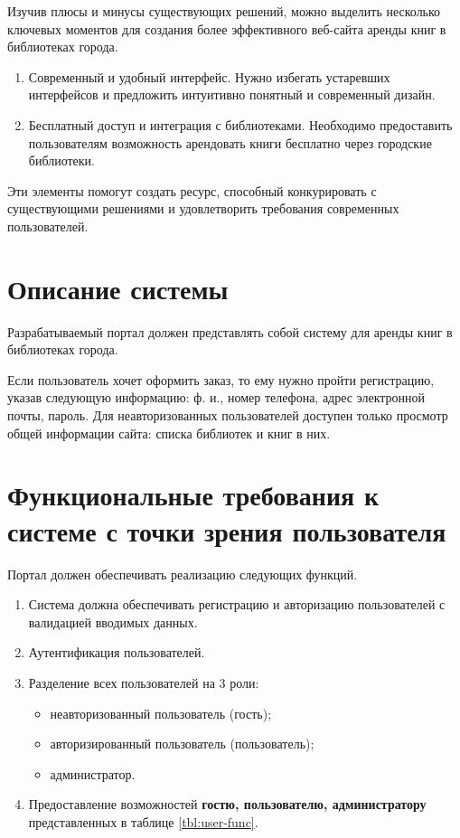 Изучив плюсы и минусы существующих решений, можно выделить несколько ключевых моментов для создания более эффективного веб-сайта аренды книг в библиотеках города.
\begin{enumerate}
  \item Современный и удобный интерфейс. Нужно избегать устаревших интерфейсов и предложить интуитивно понятный и современный дизайн.
  \item Бесплатный доступ и интеграция с библиотеками. Необходимо предоставить пользователям возможность арендовать книги бесплатно через городские библиотеки.
\end{enumerate}

Эти элементы помогут создать ресурс, способный конкурировать с существующими решениями и удовлетворить требования современных пользователей.


\section{Описание системы}
Разрабатываемый портал должен представлять собой систему для аренды книг в библиотеках города. 

Если пользователь хочет оформить заказ, то ему нужно пройти регистрацию, указав следующую информацию: ф. и., номер телефона, адрес электронной почты, пароль. Для неавторизованных пользователей доступен только просмотр общей информации сайта: списка библиотек и книг в них.


\section{Функциональные требования к системе с точки зрения пользователя}
Портал должен обеспечивать реализацию следующих функций.

\begin{enumerate}
    \item Система должна обеспечивать регистрацию и авторизацию пользователей с валидацией вводимых данных.
    \item Аутентификация пользователей.
    \item Разделение всех пользователей на 3 роли:
    \begin{itemize}
      \item неавторизованный пользователь (гость);
	    \item авторизированный пользователь (пользователь);
		  \item администратор.
	\end{itemize}

  \item Предоставление возможностей \textbf{гостю, пользователю, администратору} представленных в таблице \ref{tbl:user-func}.
\end{enumerate}

